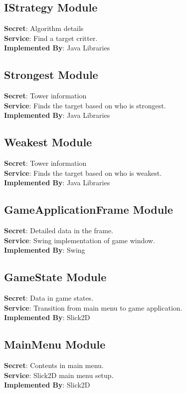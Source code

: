\documentclass[12,english]{article}
\begin{document}
    \subsection{IStrategy Module}
	\textbf{Secret}: Algorithm details \\
	\textbf{Service}:  Find a target critter.  \\ 
	\textbf{Implemented By}: Java Libraries\\
	
	\subsection{Strongest Module}
	\textbf{Secret}: Tower information \\
	\textbf{Service}:  Finds the target based on who is strongest.  \\ 
	\textbf{Implemented By}: Java Libraries\\
	
	\subsection{Weakest Module}
	\textbf{Secret}: Tower information \\
	\textbf{Service}:  Finds the target based on who is weakest.  \\ 
	\textbf{Implemented By}: Java Libraries\\
	
	\subsection{GameApplicationFrame Module}
	\textbf{Secret}: Detailed data in the frame. \\
	\textbf{Service}: Swing implementation of game window.  \\ 
	\textbf{Implemented By}: Swing\\
	
	\subsection{GameState Module}
	\textbf{Secret}: Data in game states. \\
	\textbf{Service}: Transition from main menu to game application.  \\ 
	\textbf{Implemented By}: Slick2D\\
	
	\subsection{MainMenu Module}
	\textbf{Secret}: Contents in main menu. \\
	\textbf{Service}: Slick2D main menu setup.  \\ 
	\textbf{Implemented By}: Slick2D\\
	
\end{document}
